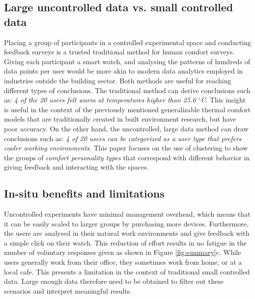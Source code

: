 
\subsection{Large uncontrolled data vs. small controlled data}



Placing a group of participants in a controlled experimental space and conducting feedback surveys is a trusted traditional method for human comfort surveys. Giving each participant a smart watch, and analysing the patterns of hundreds of data points per user would be more akin to modern data analytics employed in industries outside the building sector. Both methods are useful for reaching different types of conclusions. The traditional method can derive conclusions such as: \emph{4 of the 20 users felt warm at temperatures higher than 25.6 $^\circ$C}. This insight is useful in the context of the previously mentioned generalizable thermal comfort models that are traditionally created in built environment research, but have poor accuracy. On the other hand, the uncontrolled, large data method can draw conclusions such as: \emph{4 of 20 users can be categorized as a user type that prefers cooler working environments}. This paper focuses on the use of clustering to show the groups of \emph{comfort personality types} that correspond with different behavior in giving feedback and interacting with the spaces. 



\subsection{In-situ benefits and limitations}
Uncontrolled experiments have minimal management overhead, which means that it can be easily scaled to larger groups by purchasing more devices. Furthermore, the users are analysed in their natural work environments and give feedback with a simple click on their watch. This reduction of effort results in no fatigue in the number of voluntary responses given as shown in Figure \ref{fig:summary}c. While users generally work from their office, they sometimes work from home, or at a local cafe. This presents a limitation in the context of traditional small controlled data. Large enough data therefore need to be obtained to filter out these scenarios and interpret meaningful results.


